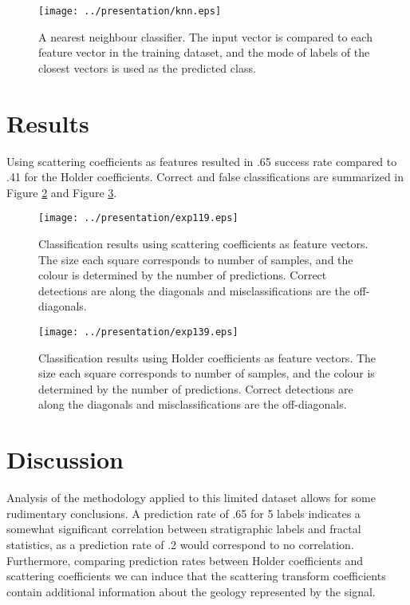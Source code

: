 \documentclass[journal]{IEEEtran}
\begin{document}
 \begin{figure}[!t]
\centering
\texttt{[image: ../presentation/knn.eps]}
\caption{A nearest neighbour classifier. The input vector is compared to each feature  vector in the training dataset, and the mode of labels of the closest vectors is used as the predicted class.}
\label{fig:knn}
\end{figure}


\section{Results}
Using scattering coefficients as features resulted in .65 success rate compared to .41 for the Holder coefficients.
Correct and false classifications are summarized in Figure \ref{fig:scatter_results} and Figure \ref{fig:holder_results}.

 \begin{figure}[!t]
\centering
\texttt{[image: ../presentation/exp119.eps]}
\caption{Classification results using scattering coefficients as feature vectors. The size each square corresponds to number of samples, and the colour is determined by the number of predictions.
Correct detections are along the diagonals and misclassifications are the off-diagonals.}
\label{fig:scatter_results}
\end{figure}

 \begin{figure}[!t]
\centering
\texttt{[image: ../presentation/exp139.eps]}
\caption{Classification results using Holder coefficients as feature vectors. The size each square corresponds to number of samples, and the colour is determined by the number of predictions.
Correct detections are along the diagonals and misclassifications are the off-diagonals.}
\label{fig:holder_results}
\end{figure}

\section{Discussion}
Analysis of the methodology applied to this limited dataset allows for some rudimentary conclusions. A prediction rate of .65 for 5 labels indicates a somewhat
significant correlation between stratigraphic labels and fractal statistics, as a prediction rate of .2 would correspond to no correlation. Furthermore, comparing
prediction rates between Holder coefficients and scattering coefficients we can induce that the scattering transform coefficients contain additional information
about the geology represented by the signal. 
\end{document}
